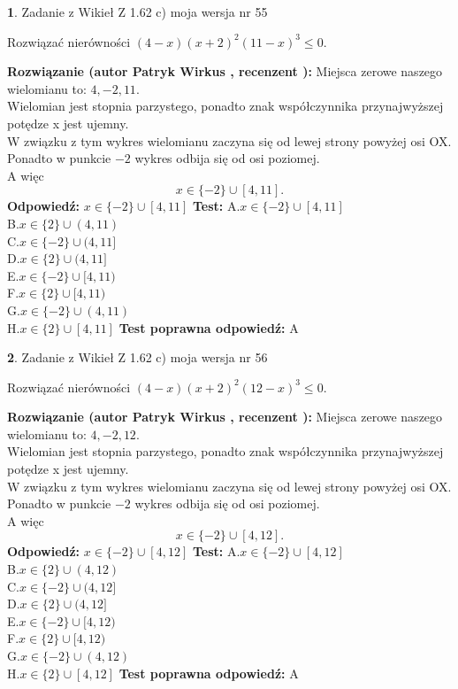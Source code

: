 \documentclass[12pt, a4paper]{article}
\theoremstyle{definition} %
\newtheorem{zad}{}
\newcommand{\zadStart}[1]{\begin{zad}#1\newline}
\newcommand{\zadStop}{\end{zad}}
\newcommand{\rozwStart}[2]{\noindent \textbf{Rozwiązanie (autor #1 , recenzent #2): }\newline}
\newcommand{\rozwStop}{\newline}
\newcommand{\odpStart}{\noindent \textbf{Odpowiedź:}\newline}
\newcommand{\odpStop}{\newline}
\newcommand{\testStart}{\noindent \textbf{Test:}\newline}
\newcommand{\testStop}{\newline}
\newcommand{\kluczStart}{\noindent \textbf{Test poprawna odpowiedź:}\newline}
\newcommand{\kluczStop}{\newline}
\begin{document}
\zadStart{Zadanie z Wikieł Z 1.62 c) moja wersja nr 55}

Rozwiązać nierówności $(4-x)(x+2)^{2}(11-x)^{3}\le0$.
\zadStop
\rozwStart{Patryk Wirkus}{}
Miejsca zerowe naszego wielomianu to: $4, -2, 11$.\\
Wielomian jest stopnia parzystego, ponadto znak współczynnika przy\linebreak najwyższej potędze x jest ujemny.\\ W związku z tym wykres wielomianu zaczyna się od lewej strony powyżej osi OX.\\
Ponadto w punkcie $-2$ wykres odbija się od osi poziomej.\\
A więc $$x \in \{-2\} \cup [4,11].$$
\rozwStop
\odpStart
$x \in \{-2\} \cup [4,11]$
\odpStop
\testStart
A.$x \in \{-2\} \cup [4,11]$\\
B.$x \in \{2\} \cup (4,11)$\\
C.$x \in \{-2\} \cup (4,11]$\\
D.$x \in \{2\} \cup (4,11]$\\
E.$x \in \{-2\} \cup [4,11)$\\
F.$x \in \{2\} \cup [4,11)$\\
G.$x \in \{-2\} \cup (4,11)$\\
H.$x \in \{2\} \cup [4,11]$
\testStop
\kluczStart
A
\kluczStop



\zadStart{Zadanie z Wikieł Z 1.62 c) moja wersja nr 56}

Rozwiązać nierówności $(4-x)(x+2)^{2}(12-x)^{3}\le0$.
\zadStop
\rozwStart{Patryk Wirkus}{}
Miejsca zerowe naszego wielomianu to: $4, -2, 12$.\\
Wielomian jest stopnia parzystego, ponadto znak współczynnika przy\linebreak najwyższej potędze x jest ujemny.\\ W związku z tym wykres wielomianu zaczyna się od lewej strony powyżej osi OX.\\
Ponadto w punkcie $-2$ wykres odbija się od osi poziomej.\\
A więc $$x \in \{-2\} \cup [4,12].$$
\rozwStop
\odpStart
$x \in \{-2\} \cup [4,12]$
\odpStop
\testStart
A.$x \in \{-2\} \cup [4,12]$\\
B.$x \in \{2\} \cup (4,12)$\\
C.$x \in \{-2\} \cup (4,12]$\\
D.$x \in \{2\} \cup (4,12]$\\
E.$x \in \{-2\} \cup [4,12)$\\
F.$x \in \{2\} \cup [4,12)$\\
G.$x \in \{-2\} \cup (4,12)$\\
H.$x \in \{2\} \cup [4,12]$
\testStop
\kluczStart
A
\kluczStop
\end{document}
